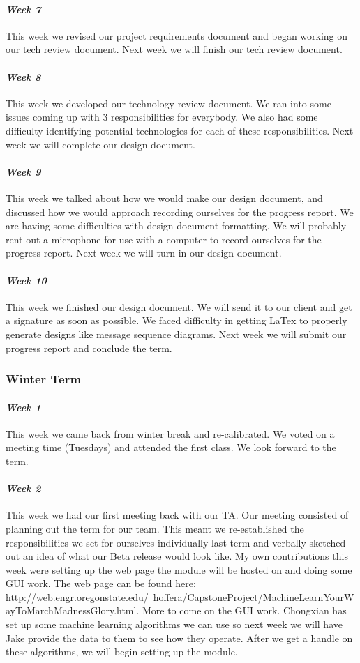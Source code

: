 \documentclass[onecolumn, draftclsnofoot,10pt, compsoc]{IEEEtran}
\begin{document}
\paragraph{\emph{Week 7}}
This week we revised our project requirements document and began working on our tech review document. Next week we will finish our tech review document.
\paragraph{\emph{Week 8}}
This week we developed our technology review document. We ran into some issues coming up with 3 responsibilities for everybody. We also had some difficulty identifying potential technologies for each of these responsibilities. Next week we will complete our design document.
\paragraph{\emph{Week 9}}
This week we talked about how we would make our design document, and discussed how we would approach recording ourselves for the progress report. We are having some difficulties with design document formatting. We will probably rent out a microphone for use with a computer to record ourselves for the progress report. Next week we will turn in our design document.
\paragraph{\emph{Week 10}}
This week we finished our design document. We will send it to our client and get a signature as soon as possible. We faced difficulty in getting LaTex to properly generate designs like message sequence diagrams. Next week we will submit our progress report and conclude the term.
\subsubsection{Winter Term}
\paragraph{\emph{Week 1}}
This week we came back from winter break and re-calibrated. We voted on a meeting time (Tuesdays) and attended the first class. We look forward to the term.
\paragraph{\emph{Week 2}}
This week we had our first meeting back with our TA. Our meeting consisted of planning out the term for our team. This meant we re-established the responsibilities we set for ourselves individually last term and verbally sketched out an idea of what our Beta release would look like. My own contributions this week were setting up the web page the module will be hosted on and doing some GUI work. The web page can be found here: http://web.engr.oregonstate.edu/~hoffera/CapstoneProject/MachineLearnYourWayToMarchMadnessGlory.html. More to come on the GUI work. Chongxian has set up some machine learning algorithms we can use so next week we will have Jake provide the data to them to see how they operate. After we get a handle on these algorithms, we will begin setting up the module.
\end{document}
